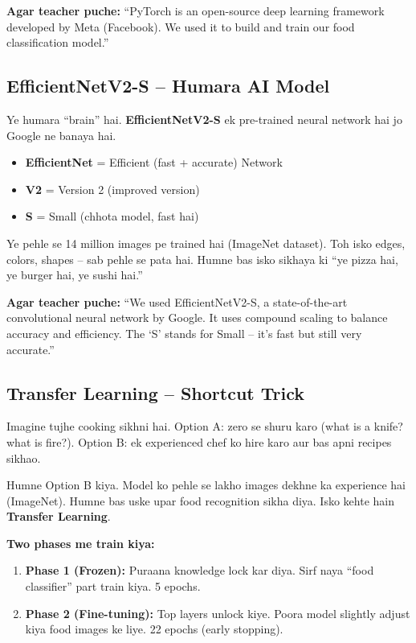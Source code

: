 \documentclass[11pt,a4paper]{article}
\begin{document}
\textbf{Agar teacher puche:} ``PyTorch is an open-source deep learning framework developed by Meta (Facebook). We used it to build and train our food classification model.''

\subsection{EfficientNetV2-S -- Humara AI Model}
Ye humara ``brain'' hai. \textbf{EfficientNetV2-S} ek pre-trained neural network hai jo Google ne banaya hai.

\begin{itemize}[leftmargin=1.2cm]
\item \textbf{EfficientNet} = Efficient (fast + accurate) Network
\item \textbf{V2} = Version 2 (improved version)
\item \textbf{S} = Small (chhota model, fast hai)
\end{itemize}

Ye pehle se 14 million images pe trained hai (ImageNet dataset). Toh isko edges, colors, shapes -- sab pehle se pata hai. Humne bas isko sikhaya ki ``ye pizza hai, ye burger hai, ye sushi hai.''

\textbf{Agar teacher puche:} ``We used EfficientNetV2-S, a state-of-the-art convolutional neural network by Google. It uses compound scaling to balance accuracy and efficiency. The `S' stands for Small -- it's fast but still very accurate.''

\subsection{Transfer Learning -- Shortcut Trick}
Imagine tujhe cooking sikhni hai. Option A: zero se shuru karo (what is a knife? what is fire?). Option B: ek experienced chef ko hire karo aur bas apni recipes sikhao.

Humne Option B kiya. Model ko pehle se lakho images dekhne ka experience hai (ImageNet). Humne bas uske upar food recognition sikha diya. Isko kehte hain \textbf{Transfer Learning}.

\textbf{Two phases me train kiya:}
\begin{enumerate}[leftmargin=1.2cm]
\item \textbf{Phase 1 (Frozen):} Puraana knowledge lock kar diya. Sirf naya ``food classifier'' part train kiya. 5 epochs.
\item \textbf{Phase 2 (Fine-tuning):} Top layers unlock kiye. Poora model slightly adjust kiya food images ke liye. 22 epochs (early stopping).
\end{enumerate}
\end{document}
